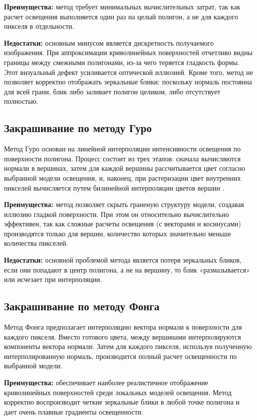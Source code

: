 \textbf{Преимущества:} метод требует минимальных вычислительных затрат, так как расчет освещения выполняется один раз на целый полигон, а не для каждого пикселя в отдельности.

\textbf{Недостатки:} основным минусом является дискретность получаемого изображения. При аппроксимации криволинейных поверхностей отчетливо видны границы между смежными полигонами, из-за чего теряется гладкость формы. Этот визуальный дефект усиливается оптической иллюзией. Кроме того, метод не позволяет корректно отображать зеркальные блики: поскольку нормаль постоянна для всей грани, блик либо заливает полигон целиком, либо отсутствует полностью.

\subsection{Закрашивание по методу Гуро}

Метод Гуро основан на линейной интерполяции интенсивности освещения по поверхности полигона. Процесс состоит из трех этапов: сначала вычисляются нормали в вершинах, затем для каждой вершины рассчитывается цвет согласно выбранной модели освещения, и, наконец, при растеризации цвет внутренних пикселей вычисляется путем билинейной интерполяции цветов вершин \cite{rogers_base}.

\textbf{Преимущества:} метод позволяет скрыть граненую структуру модели, создавая иллюзию гладкой поверхности. При этом он относительно вычислительно эффективен, так как сложные расчеты освещения (с векторами и косинусами) производятся только для вершин, количество которых значительно меньше количества пикселей.

\textbf{Недостатки:} основной проблемой метода является потеря зеркальных бликов, если они попадают в центр полигона, а не на вершину, то блик «размазывается» или исчезает при интерполяции.

\subsection{Закрашивание по методу Фонга}

Метод Фонга предполагает интерполяцию вектора нормали к поверхности для каждого пикселя. Вместо готового цвета, между вершинами интерполируются компоненты вектора нормали. Затем для каждого пикселя, используя полученную интерполированную нормаль, производится полный расчет освещенности по выбранной модели. \cite{rogers_base}

\textbf{Преимущества:} обеспечивает наиболее реалистичное отображение криволинейных поверхностей среди локальных моделей освещения. Метод корректно воспроизводит четкие зеркальные блики в любой точке полигона и дает очень плавные градиенты освещенности.

